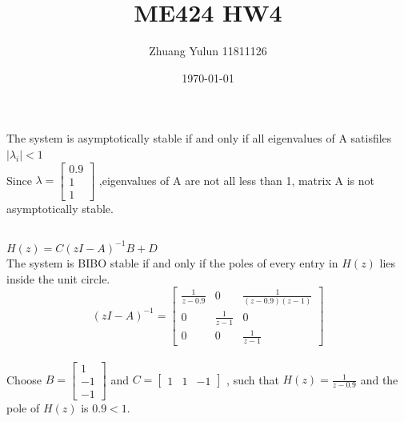 \documentclass{article}
\title{ME424 HW4}
\author{Zhuang Yulun 11811126}
\date{\today}
\begin{document}
\maketitle

\section{}
\subsection{}
The system is asymptotically stable if and only if all eigenvalues of A satisfiles $\left|\lambda_i\right|<1$
\\
Since
$
\lambda=
\begin{bmatrix}
    0.9\\1\\1
\end{bmatrix}
$
,eigenvalues of A are not all less than 1, matrix A is not asymptotically stable.
\subsection{}
$H(z)=C(zI-A)^{-1}B+D$\\
The system is BIBO stable if and only if the poles of every entry in $H(z)$ lies inside the unit circle.
\\

$$
(zI-A)^{-1}=
\begin{bmatrix}
    \frac{1}{z-0.9}&0&\frac{1}{(z-0.9)(z-1)}\\
    0&\frac{1}{z-1}&0\\
    0&0&\frac{1}{z-1}
\end{bmatrix}
$$\\
Choose
$
B=
\begin{bmatrix}
    1\\-1\\-1
\end{bmatrix}
$
and
$
C=
\begin{bmatrix}
    1&1&-1
\end{bmatrix}
$
, such that $H(z)=\frac{1}{z-0.9}$ and the pole of $H(z)$ is $0.9<1$.
\section{}
\subsection{}
\end{document}
